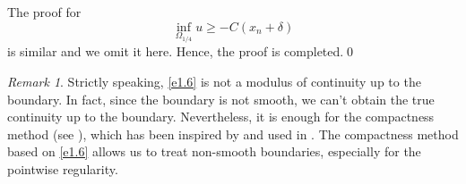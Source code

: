 \documentclass[preprint,12pt]{elsarticle}
\theoremstyle{definition}
\theoremstyle{remark}
\newtheorem{remark}[theorem]{Remark}
\numberwithin{equation}{section}
\begin{document}
The proof for
\begin{equation*}
  \inf_{\Omega_{1/4}} u \geq -C(x_n+\delta)
\end{equation*}
is similar and we omit it here. Hence, the proof is completed.\qed~\\
\begin{remark}\label{re2.1}
Strictly speaking, \cref{e1.6} is not a modulus of continuity up to the boundary. In fact, since the boundary is not smooth, we can't obtain the true continuity up to the boundary. Nevertheless, it is enough for the compactness method (see ), which has been inspired by \cite[Lemma 3.4]{MR3246039} and used in \cite[Lemma 2.4]{MR4088470}. The compactness method based on \cref{e1.6} allows us to treat non-smooth boundaries, especially for the pointwise regularity.
\end{remark}
\end{document}
